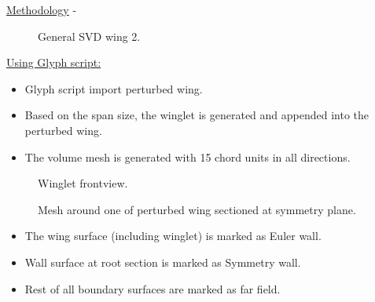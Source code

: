 \begin{frame}[allowframebreaks]{\underline{Methodology} -}
{\begin{figure}
    \caption{General SVD wing 2.}
    \label{svd_wing_2}
\end{figure}
}
\underline{Using Glyph script:}
\begin{itemize}
\item Glyph script import perturbed wing.
\item Based on the span size, the winglet is generated and appended into the perturbed wing.
\item The volume mesh is generated with 15 chord units in all directions.
\end{itemize}

\parbox{0.47\linewidth}{
\begin{figure}
    \centering
    \caption{Winglet frontview.}
    \label{winglet_frontview}
\end{figure}
}
\parbox{0.47\linewidth}{
\begin{figure}
    \centering
    \caption{Mesh around one of perturbed wing sectioned at symmetry plane.}
    \label{airfoil_mesh}
\end{figure}
}
\begin{itemize}
\item The wing surface (including winglet) is marked as Euler wall.
\item Wall surface at root section is marked as Symmetry wall. 
\item Rest of all boundary surfaces are marked as far field.
\end{itemize}


\end{frame}
